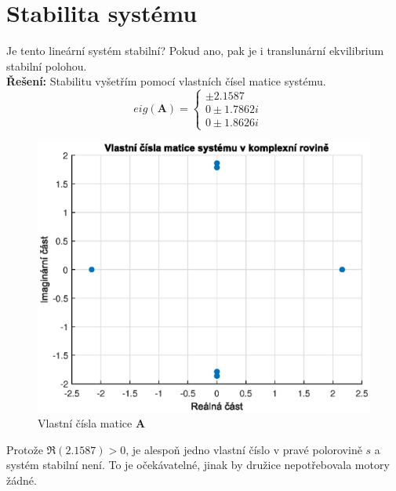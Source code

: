 \documentclass[twoside]{article}
\begin{document}
\section{Stabilita systému}
\label{sec:ukol1}
Je tento lineární systém stabilní? Pokud ano, pak je i translunární ekvilibrium stabilní polohou. \\
\textbf{Řešení:}
Stabilitu vyšetřím pomocí vlastních čísel matice systému.
\begin{equation*}
	eig(\mathbf{A}) =
	\begin{cases}
		\pm 2.1587 & \\
		0 \pm 1.7862i & \\
		0 \pm 1.8626i \ &
	\end{cases}
\end{equation*}
\begin{figure}[hbtp]
	\centering
	\includegraphics{vlastni_cisla.eps}
	\caption{Vlastní čísla matice $\mathbf{A}$}
	\label{fig:vlastni_cisla}
\end{figure}
Protože $\Re(2.1587) > 0$, je alespoň jedno vlastní číslo v pravé polorovině $s$ a systém stabilní není.
To je očekávatelné, jinak by družice nepotřebovala motory žádné. 
\end{document}
